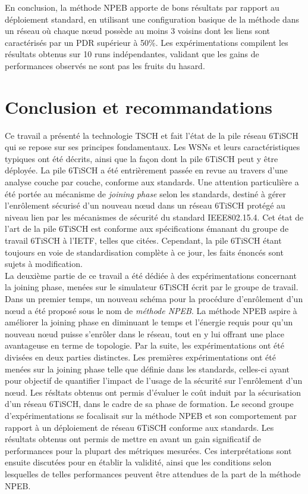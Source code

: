 \documentclass[]{report}
\begin{document}
En conclusion, la méthode NPEB apporte de bons résultats par rapport au déploiement standard, en utilisant une configuration basique de la méthode dans un réseau où chaque nœud possède au moins 3 voisins dont les liens sont caractérisés par un PDR supérieur à 50\%. Les expérimentations compilent les résultats obtenus sur 10 runs indépendantes, validant que les gains de performances observés ne sont pas les fruits du hasard.

\chapter*{Conclusion et recommandations}

\large

Ce travail a présenté la technologie TSCH et fait l'état de la pile réseau 6TiSCH qui se repose sur ses principes fondamentaux. Les WSNs et leurs caractéristiques typiques ont été décrits, ainsi que la façon dont la pile 6TiSCH peut y être déployée. La pile 6TiSCH a été entrièrement passée en revue au travers d'une analyse couche par couche, conforme aux standards. Une attention particulière a été portée au mécanisme de \textit{joining phase} selon les standards, destiné à gérer l'enrôlement sécurisé d'un nouveau nœud dans un réseau 6TiSCH protégé au niveau lien par les mécanismes de sécurité du standard IEEE802.15.4. Cet état de l'art de la pile 6TiSCH est conforme aux spécifications émanant du groupe de travail 6TiSCH à l'IETF, telles que citées. Cependant, la pile 6TiSCH étant toujours en voie de standardisation complète à ce jour, les faits énoncés sont sujets à modification.\\

La deuxième partie de ce travail a été dédiée à des expérimentations concernant la joining phase, menées sur le simulateur 6TiSCH écrit par le groupe de travail. Dans un premier temps, un nouveau schéma pour la procédure d'enrôlement d'un nœud a été proposé sous le nom de \textit{méthode NPEB}. La méthode NPEB aspire à améliorer la joining phase en diminuant le temps et l'énergie requis pour qu'un nouveau nœud puisse s'enrôler dans le réseau, tout en y lui offrant une place avantageuse en terme de topologie. Par la suite, les expérimentations ont été divisées en deux parties distinctes. Les premières expérimentations ont été menées sur la joining phase telle que définie dans les standards, celles-ci ayant pour objectif de quantifier l'impact de l'usage de la sécurité sur l'enrôlement d'un nœud. Les résltats obtenus ont permis d'évaluer le coût induit par la sécurisation d'un réseau 6TiSCH, dans le cadre de sa phase de formation. Le second groupe d'expérimentations se focalisait sur la méthode NPEB et son comportement par rapport à un déploiement de réseau 6TiSCH conforme aux standards. Les résultats obtenus ont permis de mettre en avant un gain significatif de performances pour la plupart des métriques mesurées. Ces interprétations sont ensuite discutées pour en établir la validité, ainsi que les conditions selon lesquelles de telles performances peuvent être attendues de la part de la méthode NPEB.

\normalsize



\end{document}
